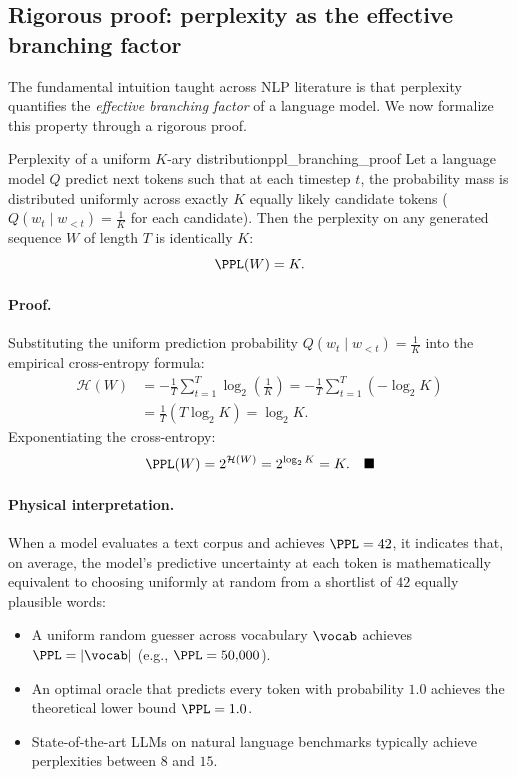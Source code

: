 \documentclass[../../main.tex]{subfiles}
\begin{document}
\subsection{Rigorous proof: perplexity as the effective branching factor}
The fundamental intuition taught across NLP literature is that perplexity quantifies the \emph{effective branching factor} of a language model. We now formalize this property through a rigorous proof.

\begin{theorem}{Perplexity of a uniform $K$-ary distribution}{ppl_branching_proof}
Let a language model $Q$ predict next tokens such that at each timestep $t$, the probability mass is distributed uniformly across exactly $K$ equally likely candidate tokens ($Q(w_t \mid w_{<t}) = \frac{1}{K}$ for each candidate). Then the perplexity on any generated sequence $W$ of length $T$ is identically $K$:
\begin{equation}
\label{eq:ppl_equals_k}
\PPL(W) = K.
\end{equation}
\end{theorem}

\paragraph{Proof.}
Substituting the uniform prediction probability $Q(w_t \mid w_{<t}) = \frac{1}{K}$ into the empirical cross-entropy formula:
\begin{align*}
\mathcal{H}(W) &= - \frac{1}{T} \sum_{t=1}^T \log_2 \left( \frac{1}{K} \right) = - \frac{1}{T} \sum_{t=1}^T \left( - \log_2 K \right) \\
&= \frac{1}{T} \left( T \log_2 K \right) = \log_2 K.
\end{align*}
Exponentiating the cross-entropy:
\[
\PPL(W) = 2^{\mathcal{H}(W)} = 2^{\log_2 K} = K. \quad \blacksquare
\]

\paragraph{Physical interpretation.}
When a model evaluates a text corpus and achieves $\PPL = 42$, it indicates that, on average, the model's predictive uncertainty at each token is mathematically equivalent to choosing uniformly at random from a shortlist of $42$ equally plausible words:
\begin{itemize}
    \item A uniform random guesser across vocabulary $\vocab$ achieves $\PPL = |\vocab|$ (e.g., $\PPL = 50{,}000$).
    \item An optimal oracle that predicts every token with probability $1.0$ achieves the theoretical lower bound $\PPL = 1.0$.
    \item State-of-the-art LLMs on natural language benchmarks typically achieve perplexities between $8$ and $15$.
\end{itemize}
\end{document}
